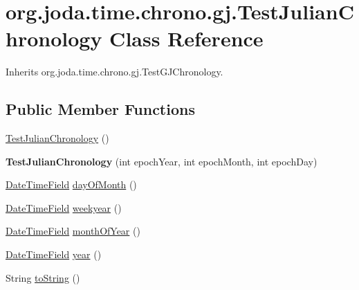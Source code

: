 \hypertarget{classorg_1_1joda_1_1time_1_1chrono_1_1gj_1_1_test_julian_chronology}{\section{org.\-joda.\-time.\-chrono.\-gj.\-Test\-Julian\-Chronology Class Reference}
\label{classorg_1_1joda_1_1time_1_1chrono_1_1gj_1_1_test_julian_chronology}
}


Inherits org.\-joda.\-time.\-chrono.\-gj.\-Test\-G\-J\-Chronology.

\subsection*{Public Member Functions}
\begin{DoxyCompactItemize}
\item 
\hyperlink{classorg_1_1joda_1_1time_1_1chrono_1_1gj_1_1_test_julian_chronology_a5300761576fe5090c37eba082ec2156d}{Test\-Julian\-Chronology} ()
\item 
\hypertarget{classorg_1_1joda_1_1time_1_1chrono_1_1gj_1_1_test_julian_chronology_a35d10dd072d90627c5efd8700fe7413d}{{\bfseries Test\-Julian\-Chronology} (int epoch\-Year, int epoch\-Month, int epoch\-Day)}\label{classorg_1_1joda_1_1time_1_1chrono_1_1gj_1_1_test_julian_chronology_a35d10dd072d90627c5efd8700fe7413d}

\item 
\hyperlink{classorg_1_1joda_1_1time_1_1_date_time_field}{Date\-Time\-Field} \hyperlink{classorg_1_1joda_1_1time_1_1chrono_1_1gj_1_1_test_julian_chronology_a8dfa11d76243a258f607568af2d1e63d}{day\-Of\-Month} ()
\item 
\hyperlink{classorg_1_1joda_1_1time_1_1_date_time_field}{Date\-Time\-Field} \hyperlink{classorg_1_1joda_1_1time_1_1chrono_1_1gj_1_1_test_julian_chronology_a1e9122699ac952f966774986ad1955cd}{weekyear} ()
\item 
\hyperlink{classorg_1_1joda_1_1time_1_1_date_time_field}{Date\-Time\-Field} \hyperlink{classorg_1_1joda_1_1time_1_1chrono_1_1gj_1_1_test_julian_chronology_a6cd8834b183e25be0bfe0eed79b7ee3e}{month\-Of\-Year} ()
\item 
\hyperlink{classorg_1_1joda_1_1time_1_1_date_time_field}{Date\-Time\-Field} \hyperlink{classorg_1_1joda_1_1time_1_1chrono_1_1gj_1_1_test_julian_chronology_a34279d4b6e3851b703e3fb205717da02}{year} ()
\item 
String \hyperlink{classorg_1_1joda_1_1time_1_1chrono_1_1gj_1_1_test_julian_chronology_a8e0fc889e04d9eef723eadcc444d5334}{to\-String} ()
\end{DoxyCompactItemize}
